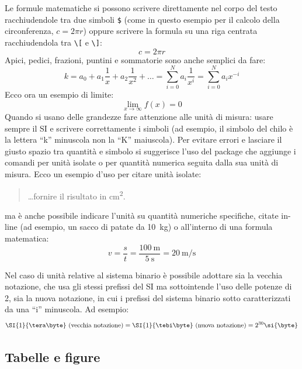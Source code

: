 Le formule matematiche si possono scrivere direttamente nel corpo del testo racchiudendole tra due simboli \verb+$+
(come in questo esempio per il calcolo della circonferenza, $c = 2 \pi r$)
oppure scrivere la formula su una riga centrata racchiudendola tra \verb+\[+ e \verb+\]+:
\[
c = 2 \pi r
\]
Apici, pedici, frazioni, puntini e sommatorie sono anche semplici da fare:
\[
k = a_0 + a_1 \frac{1}{x} + a_2 \frac{1}{x^2} + \dots = \sum_{i=0}^N a_i \frac{1}{x^i} = \sum_{i=0}^N a_i x^{-i}
\]
Ecco ora un esempio di limite:
\[
\lim_{x\to\infty}f(x)=0
\]
Quando si usano delle grandezze fare attenzione alle unità di misura: usare sempre il SI e scrivere correttamente i simboli (ad esempio, il simbolo del chilo è la lettera ``k'' minuscola non la ``K'' maiuscola).
Per evitare errori e lasciare il giusto spazio tra quantità e simbolo si suggerisce l'uso del package  che aggiunge i comandi  per unità isolate o  per quantità numerica seguita dalla sua unità di misura.
Ecco un esempio d'uso per citare unità isolate:
\begin{quote}
\ldots fornire il risultato in \si{\square\centi\metre}.
\end{quote}
ma è anche possibile indicare l'unità su quantità numeriche specifiche, citate in-line (ad esempio, un sacco di patate da \SI{10}{\kilo\gram}) o all'interno di una formula matematica:
\[
v = \frac{s}{t} = \frac{ \SI{100}{\meter} }{ \SI{5}{\second} } = \SI{20}{\meter\per\second}
\]

Nel caso di unità relative al sistema binario è possibile adottare sia la vecchia notazione, che usa gli stessi prefissi del SI ma sottointende l'uso delle potenze di 2, sia la nuova notazione, in cui i prefissi del sistema binario sotto caratterizzati da una ``i'' minuscola.
Ad esempio:
\[
\SI{1}{\tera\byte}\ \mbox{(vecchia notazione)} =
\SI{1}{\tebi\byte}\ \mbox{(nuova notazione)} =
2^{30} \si{\byte}
\]


\subsection{Tabelle e figure}

